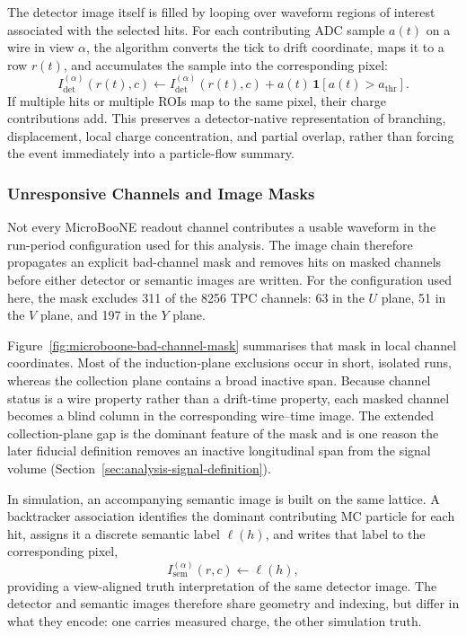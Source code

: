 The detector image itself is filled by looping over waveform regions of
interest associated with the selected hits. For each contributing ADC sample
\(a(t)\) on a wire in view \(\alpha\), the algorithm converts the tick to drift
coordinate, maps it to a row \(r(t)\), and accumulates the sample into the
corresponding pixel:
\begin{equation}
  I_{\mathrm{det}}^{(\alpha)}(r(t),c)
  \leftarrow
  I_{\mathrm{det}}^{(\alpha)}(r(t),c)
  + a(t)\,\mathbf{1}\!\left[a(t)>a_{\mathrm{thr}}\right].
\end{equation}
If multiple hits or multiple ROIs map to the same pixel, their charge
contributions add. This preserves a detector-native representation of
branching, displacement, local charge concentration, and partial overlap,
rather than forcing the event immediately into a particle-flow summary.

\subsubsection{Unresponsive Channels and Image Masks}

Not every MicroBooNE readout channel contributes a usable waveform in the
run-period configuration used for this analysis. The image chain therefore
propagates an explicit bad-channel mask and removes hits on masked channels
before either detector or semantic images are written. For the configuration
used here, the mask excludes 311 of the 8256 TPC channels: 63 in the \(U\)
plane, 51 in the \(V\) plane, and 197 in the \(Y\) plane.

Figure~\ref{fig:microboone-bad-channel-mask} summarises that mask in local
channel coordinates. Most of the induction-plane exclusions occur in short,
isolated runs, whereas the collection plane contains a broad inactive span.
Because channel status is a wire property rather than a drift-time property,
each masked channel becomes a blind column in the corresponding wire--time
image. The extended collection-plane gap is the dominant feature of the mask
and is one reason the later fiducial definition removes an inactive
longitudinal span from the signal volume
(Section~\ref{sec:analysis-signal-definition}).



In simulation, an accompanying semantic image is built on the same lattice. A
backtracker association identifies the dominant contributing MC particle for
each hit, assigns it a discrete semantic label \(\ell(h)\), and writes that
label to the corresponding pixel,
\begin{equation}
  I_{\mathrm{sem}}^{(\alpha)}(r,c)\leftarrow \ell(h),
\end{equation}
providing a view-aligned truth interpretation of the same detector image. The
detector and semantic images therefore share geometry and indexing, but differ
in what they encode: one carries measured charge, the other simulation truth.

